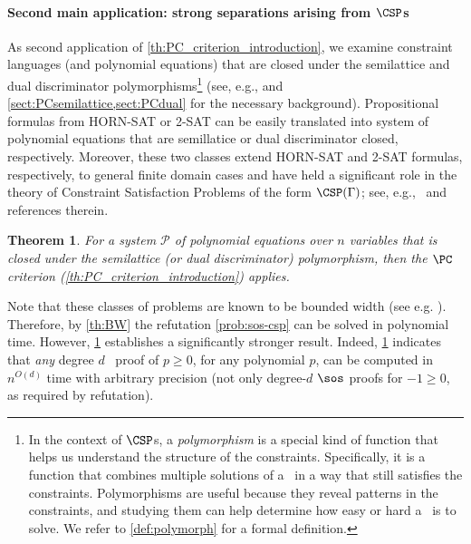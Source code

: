 \documentclass[11pt]{article}
\newtheorem{theorem}{Theorem}[section]
\begin{document}
\paragraph{Second main application: strong separations arising from $\CSP$s}\label{sec:separation-intro}
%
As second application of \cref{th:PC_criterion_introduction}, we examine constraint languages (and polynomial equations) that are closed under the semilattice and dual discriminator polymorphisms\footnote{In the context of $\CSP$s, a \emph{polymorphism} is a special kind of function that helps us understand the structure of the constraints. Specifically, it is a function that combines multiple solutions of a \CSP\ in a way that still satisfies the constraints. Polymorphisms are useful because they reveal patterns in the constraints, and studying them can help determine how easy or hard a \CSP\ is to solve. We refer to \cref{def:polymorph} for a formal definition.} (see, e.g., \cite{barto_et_al:DFU:2017:6959} and \cref{sect:PCsemilattice,sect:PCdual} for the necessary background). 
Propositional formulas from \textsc{HORN-SAT} or \textsc{2-SAT} can be easily translated into system of polynomial equations that are semillatice or dual discriminator closed, respectively.
%
Moreover, these two classes extend \textsc{HORN-SAT} and \textsc{2-SAT} formulas, respectively, to general finite domain cases and have held a significant role in the theory of Constraint Satisfaction Problems of the form $\CSP(\Gamma)$; see, e.g.,~\cite{barto_et_al:DFU:2017:6959,2017dfu7} and references therein.

\begin{theorem}\label{th:semilattice+dualdiscr}
    For a system $\mathcal{P}$ of polynomial equations over $n$ variables that is closed under the semilattice (or dual discriminator) polymorphism, then the $\PC$ criterion (\cref{th:PC_criterion_introduction}) applies.
\end{theorem}
%
Note that these classes of problems are known to be bounded width (see e.g. \cite{barto_et_al:DFU:2017:6959}). Therefore, by \cref{th:BW} the refutation \cref{prob:sos-csp} can be solved in polynomial time.
However, \cref{th:semilattice+dualdiscr} establishes a significantly stronger result.
Indeed, \cref{th:semilattice+dualdiscr} indicates that \emph{any} degree \( d \) \sos\ proof of $p\geq 0$, for any polynomial $p$, can be computed in \( n^{O(d)} \) time with arbitrary precision (not only degree-$d$ $\sos$ proofs for $-1\geq 0$, as required by refutation). %
\end{document}
